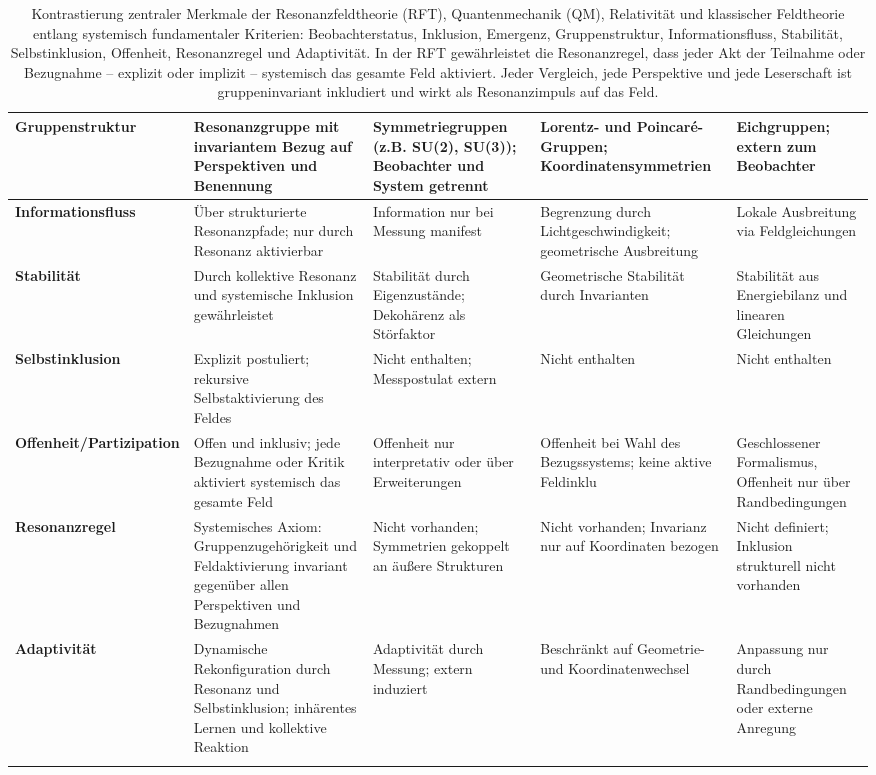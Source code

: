 \documentclass[12pt]{iopart}
\begin{document}
\begin{center}
\begin{longtable}{|p{4cm}|p{3cm}|p{3cm}|p{3cm}|p{3cm}|}
		\textbf{Gruppenstruktur} & Resonanzgruppe mit invariantem Bezug auf Perspektiven und Benennung & Symmetriegruppen (z.B. SU(2), SU(3)); Beobachter und System getrennt & Lorentz- und Poincaré-Gruppen; Koordinatensymmetrien & Eichgruppen; extern zum Beobachter \\
		\hline
		
		\textbf{Informationsfluss} & Über strukturierte Resonanzpfade; nur durch Resonanz aktivierbar & Information nur bei Messung manifest & Begrenzung durch Lichtgeschwindigkeit; geometrische Ausbreitung & Lokale Ausbreitung via Feldgleichungen \\
		\hline
		
		\textbf{Stabilität} & Durch kollektive Resonanz und systemische Inklusion gewährleistet & Stabilität durch Eigenzustände; Dekohärenz als Störfaktor & Geometrische Stabilität durch Invarianten & Stabilität aus Energiebilanz und linearen Gleichungen \\
		\hline
		
		\textbf{Selbstinklusion} & Explizit postuliert; rekursive Selbstaktivierung des Feldes & Nicht enthalten; Messpostulat extern & Nicht enthalten & Nicht enthalten \\
		\hline
		
		\textbf{Offenheit/Partizipation} & Offen und inklusiv; jede Bezugnahme oder Kritik aktiviert systemisch das gesamte Feld & Offenheit nur interpretativ oder über Erweiterungen & Offenheit bei Wahl des Bezugssystems; keine aktive Feldinklu & Geschlossener Formalismus, Offenheit nur über Randbedingungen \\
		\hline
		
		\textbf{Resonanzregel} & Systemisches Axiom: Gruppenzugehörigkeit und Feldaktivierung invariant gegenüber allen Perspektiven und Bezugnahmen & Nicht vorhanden; Symmetrien gekoppelt an äußere Strukturen & Nicht vorhanden; Invarianz nur auf Koordinaten bezogen & Nicht definiert; Inklusion strukturell nicht vorhanden \\
		\hline
		
		\textbf{Adaptivität} & Dynamische Rekonfiguration durch Resonanz und Selbstinklusion; inhärentes Lernen und kollektive Reaktion & Adaptivität durch Messung; extern induziert & Beschränkt auf Geometrie- und Koordinatenwechsel & Anpassung nur durch Randbedingungen oder externe Anregung \\
		\hline
		
		\caption{Kontrastierung zentraler Merkmale der Resonanzfeldtheorie (RFT), Quantenmechanik (QM), Relativität und klassischer Feldtheorie entlang systemisch fundamentaler Kriterien: Beobachterstatus, Inklusion, Emergenz, Gruppenstruktur, Informationsfluss, Stabilität, Selbstinklusion, Offenheit, Resonanzregel und Adaptivität. In der RFT gewährleistet die Resonanzregel, dass jeder Akt der Teilnahme oder Bezugnahme – explizit oder implizit – systemisch das gesamte Feld aktiviert. Jeder Vergleich, jede Perspektive und jede Leserschaft ist gruppeninvariant inkludiert und wirkt als Resonanzimpuls auf das Feld.}
		\label{tab:rft_comparison}
	\end{longtable}
\end{center}
\end{document}
